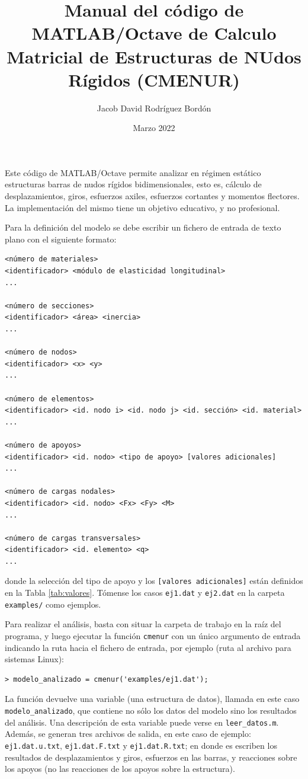 \documentclass[a4paper,11pt]{article}
\title{Manual del código de MATLAB/Octave de Calculo Matricial de Estructuras de NUdos R\'igidos (CMENUR)}
\author{Jacob David Rodr\'iguez Bord\'on}
\date{Marzo 2022}
\begin{document}
\maketitle

Este código de MATLAB/Octave permite analizar en régimen estático estructuras barras de nudos rígidos bidimensionales, esto es, cálculo de desplazamientos, giros, esfuerzos axiles, esfuerzos cortantes y momentos flectores. La implementación del mismo tiene un objetivo educativo, y no profesional.

Para la definición del modelo se debe escribir un fichero de entrada de texto plano con el siguiente formato:
\begin{Verbatim}[frame=single,fontsize=\small]
<número de materiales>
<identificador> <módulo de elasticidad longitudinal>
...

<número de secciones>
<identificador> <área> <inercia>
...

<número de nodos>
<identificador> <x> <y>
...

<número de elementos>
<identificador> <id. nodo i> <id. nodo j> <id. sección> <id. material>
...

<número de apoyos>
<identificador> <id. nodo> <tipo de apoyo> [valores adicionales]
...

<número de cargas nodales>
<identificador> <id. nodo> <Fx> <Fy> <M>
...

<número de cargas transversales>
<identificador> <id. elemento> <q> 
...

\end{Verbatim}
donde la selección del tipo de apoyo y los \texttt{[valores adicionales]} están definidos en la Tabla \ref{tab:valores}. Tómense los casos \texttt{ej1.dat} y \texttt{ej2.dat} en la carpeta \texttt{examples/} como ejemplos.

Para realizar el análisis, basta con situar la carpeta de trabajo en la raíz del programa, y luego ejecutar la función \texttt{cmenur} con un único argumento de entrada indicando la ruta hacia el fichero de entrada, por ejemplo (ruta al archivo para sistemas Linux):
\begin{Verbatim}[frame=single,fontsize=\small]
> modelo_analizado = cmenur('examples/ej1.dat');
\end{Verbatim}
La función devuelve una variable (una estructura de datos), llamada en este caso \texttt{modelo\_analizado}, que contiene no sólo los datos del modelo sino los resultados del análisis. Una descripción de esta variable puede verse en \texttt{leer\_datos.m}. Además, se generan tres archivos de salida, en este caso de ejemplo: \texttt{ej1.dat.u.txt}, \texttt{ej1.dat.F.txt} y \texttt{ej1.dat.R.txt}; en donde es escriben los resultados de desplazamientos y giros, esfuerzos en las barras, y reacciones sobre los apoyos (no las reacciones de los apoyos sobre la estructura).
\end{document}
